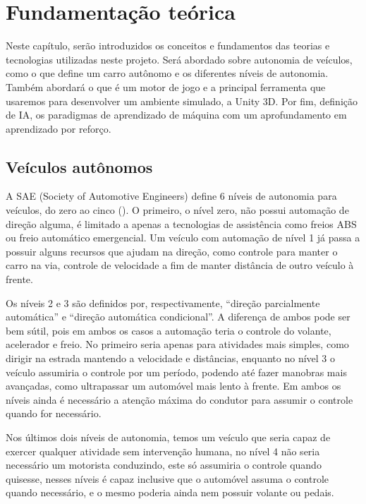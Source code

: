 \chapter{Fundamentação teórica}
Neste capítulo, serão introduzidos os conceitos e fundamentos das teorias e tecnologias utilizadas neste projeto. Será abordado sobre autonomia de veículos, como o que define um carro autônomo e os diferentes níveis de autonomia. Também abordará o que é um motor de jogo e a principal ferramenta que usaremos para desenvolver um ambiente simulado, a Unity 3D. Por fim, definição de IA, os paradigmas de aprendizado de máquina com um aprofundamento em aprendizado por reforço.

\section{Veículos autônomos}
A SAE (Society of Automotive Engineers) define 6 níveis de autonomia para veículos, do zero ao cinco (). O primeiro, o nível zero, não possui automação de direção alguma, é limitado a apenas a tecnologias de assistência como freios ABS ou freio automático emergencial. Um veículo com automação de nível 1 já passa a possuir alguns recursos que ajudam na direção, como controle para manter o carro na via, controle de velocidade a fim de manter distância de outro veículo à frente. 

Os níveis 2 e 3 são definidos por, respectivamente, ``direção parcialmente automática'' e ``direção automática condicional''. A diferença de ambos pode ser bem sútil, pois em ambos os casos a automação teria o controle do volante, acelerador e freio. No primeiro seria apenas para atividades mais simples, como dirigir na estrada mantendo a velocidade e distâncias, enquanto no nível 3 o veículo assumiria o controle por um período, podendo até fazer manobras mais avançadas, como ultrapassar um automóvel mais lento à frente. Em ambos os níveis ainda é necessário a atenção máxima do condutor para assumir o controle quando for necessário.

Nos últimos dois níveis de autonomia, temos um veículo que seria capaz de exercer qualquer atividade sem intervenção humana, no nível 4 não seria necessário um motorista conduzindo, este só assumiria o controle quando quisesse, nesses níveis é capaz inclusive que o automóvel assuma o controle quando necessário, e o mesmo poderia ainda nem possuir volante ou pedais.


